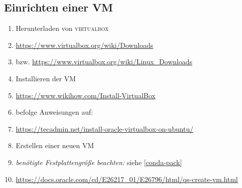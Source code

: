 \documentclass[
a4paper,     %
12pt         %
]{scrartcl}  %
\begin{document}
\subsection{Einrichten einer VM}
\begin{enumerate}
	\item Herunterladen von \textsc{virtualbox}
	\item[] \url{https://www.virtualbox.org/wiki/Downloads}
	\item[] bzw. \url{https://www.virtualbox.org/wiki/Linux_Downloads}
	\item Installieren der VM
	\item[] \url{https://www.wikihow.com/Install-VirtualBox}
	
	\item[] befolge Anweisungen auf:
	\item[] \url{https://tecadmin.net/install-oracle-virtualbox-on-ubuntu/} 
	
	\item Erstellen einer neuen VM
	\item[] \textit{benötigte Festplattengröße beachten:} siehe \ref{conda-pack}
	\item[] \url{https://docs.oracle.com/cd/E26217_01/E26796/html/qs-create-vm.html} 
\end{enumerate}
\end{document}
